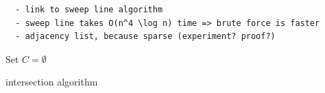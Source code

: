 \begin{verbatim}
  - link to sweep line algorithm
  - sweep line takes O(n^4 \log n) time => brute force is faster
  - adjacency list, because sparse (experiment? proof?)
\end{verbatim}

\begin{algorithm}
  \DontPrintSemicolon
  
  
  Set \(C = \emptyset\) \;
  \caption{intersection algorithm}
\end{algorithm}
  
